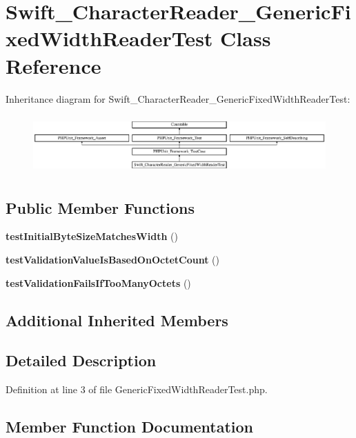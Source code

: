 \section{Swift\+\_\+\+Character\+Reader\+\_\+\+Generic\+Fixed\+Width\+Reader\+Test Class Reference}
\label{class_swift___character_reader___generic_fixed_width_reader_test}
Inheritance diagram for Swift\+\_\+\+Character\+Reader\+\_\+\+Generic\+Fixed\+Width\+Reader\+Test\+:\begin{figure}[H]
\begin{center}
\leavevmode
\includegraphics[height=2.262626cm]{class_swift___character_reader___generic_fixed_width_reader_test}
\end{center}
\end{figure}
\subsection*{Public Member Functions}
\begin{DoxyCompactItemize}
\item 
{\bf test\+Initial\+Byte\+Size\+Matches\+Width} ()
\item 
{\bf test\+Validation\+Value\+Is\+Based\+On\+Octet\+Count} ()
\item 
{\bf test\+Validation\+Fails\+If\+Too\+Many\+Octets} ()
\end{DoxyCompactItemize}
\subsection*{Additional Inherited Members}


\subsection{Detailed Description}


Definition at line 3 of file Generic\+Fixed\+Width\+Reader\+Test.\+php.



\subsection{Member Function Documentation}
